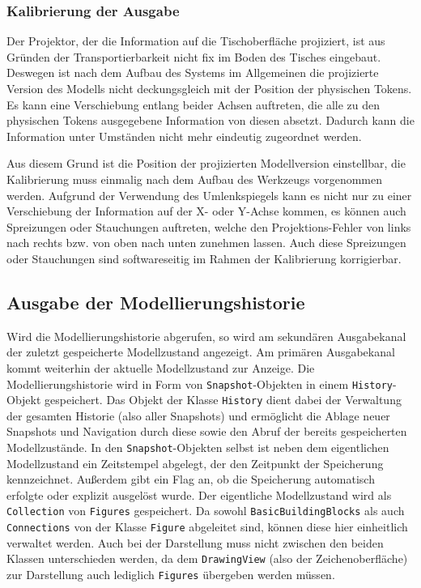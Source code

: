 \subsubsection{Kalibrierung der Ausgabe} %
\label{ssub:kalibrierung_der_ausgabe}

Der Projektor, der die Information auf die Tischoberfläche projiziert, ist aus Gründen der Transportierbarkeit nicht fix im Boden des Tisches eingebaut. Deswegen ist nach dem Aufbau des Systems im Allgemeinen die projizierte Version des Modells nicht deckungsgleich mit der Position der physischen Tokens. Es kann eine Verschiebung entlang beider Achsen auftreten, die alle zu den physischen Tokens ausgegebene Information von diesen absetzt. Dadurch kann die Information unter Umständen nicht mehr eindeutig zugeordnet werden.

Aus diesem Grund ist die Position der projizierten Modellversion einstellbar, die Kalibrierung muss einmalig nach dem Aufbau des Werkzeugs vorgenommen werden. Aufgrund der Verwendung des Umlenkspiegels kann es nicht nur zu einer Verschiebung der Information auf der X- oder Y-Achse kommen, es können auch Spreizungen oder Stauchungen auftreten, welche den Projektions-Fehler von links nach rechts bzw. von oben nach unten zunehmen lassen. Auch diese Spreizungen oder Stauchungen sind softwareseitig im Rahmen der Kalibrierung korrigierbar. 


\subsection{Ausgabe der Modellierungshistorie} %
\label{sub:ausgabe_der_modellierungshistorie}

Wird die Modellierungshistorie abgerufen, so wird am sekundären Ausgabekanal der zuletzt gespeicherte Modellzustand angezeigt. Am primären Ausgabekanal kommt weiterhin der aktuelle Modellzustand zur Anzeige. Die Modellierungshistorie wird in Form von \texttt{Snapshot}-Objekten in einem \texttt{History}-Objekt gespeichert. Das Objekt der Klasse \texttt{History} dient dabei der Verwaltung der gesamten Historie (also aller Snapshots) und ermöglicht die Ablage neuer Snapshots und Navigation durch diese sowie den Abruf der bereits gespeicherten Modellzustände. In den \texttt{Snapshot}-Objekten selbst ist neben dem eigentlichen Modellzustand ein Zeitstempel abgelegt, der den Zeitpunkt der Speicherung kennzeichnet. Außerdem gibt ein Flag an, ob die Speicherung automatisch erfolgte oder explizit ausgelöst wurde. Der eigentliche Modellzustand wird als \texttt{Collection} von \texttt{Figures} gespeichert. Da sowohl \texttt{BasicBuildingBlocks} als auch \texttt{Connections} von der Klasse \texttt{Figure} abgeleitet sind, können diese hier einheitlich verwaltet werden. Auch bei der Darstellung muss nicht zwischen den beiden Klassen unterschieden werden, da dem \texttt{DrawingView} (also der Zeichenoberfläche) zur Darstellung auch lediglich \texttt{Figures} übergeben werden müssen.

